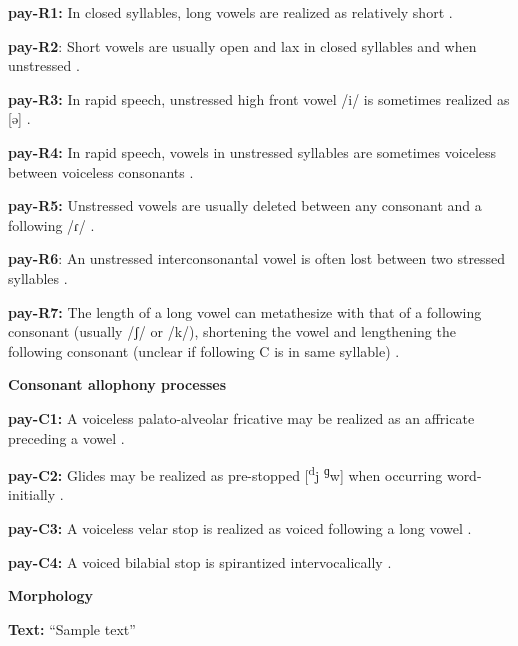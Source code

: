 \textbf{pay-R1:} In closed syllables, long vowels are realized as relatively short \citep[18]{Holt1999}.



\textbf{pay-R2}: Short vowels are usually open and lax in closed syllables and when unstressed \citep[18]{Holt1999}.



\textbf{pay-R3:} In rapid speech, unstressed high front vowel /i/ is sometimes realized as [ə] \citep[18]{Holt1999}.



\textbf{pay-R4:} In rapid speech, vowels in unstressed syllables are sometimes voiceless between voiceless consonants \citep[18]{Holt1999}.



\textbf{pay-R5:} Unstressed vowels are usually deleted between any consonant and a following /ɾ/ \citep[23]{Holt1999}.



\textbf{pay-R6}: An unstressed interconsonantal vowel is often lost between two stressed syllables \citep[23]{Holt1999}.



\textbf{pay-R7:} The length of a long vowel can metathesize with that of a following consonant (usually /ʃ/ or /k/), shortening the vowel and lengthening the following consonant (unclear if following C is in same syllable) \citep[24-5]{Holt1999}.



\textbf{Consonant allophony processes}



\textbf{pay-C1:} A voiceless palato-alveolar fricative may be realized as an affricate preceding a vowel \citep[16]{Holt1999}.



\textbf{pay-C2:} Glides may be realized as pre-stopped [\textsuperscript{d}j \textsuperscript{ɡ}w] when occurring word-initially \citep[16]{Holt1999}.



\textbf{pay-C3:} A voiceless velar stop is realized as voiced following a long vowel \citep[15-16]{Holt1999}.



\textbf{pay-C4:} A voiced bilabial stop is spirantized intervocalically \citep[16]{Holt1999}.



\textbf{Morphology}



\textbf{Text:} “Sample text” \citep[79-80]{Holt1999}



